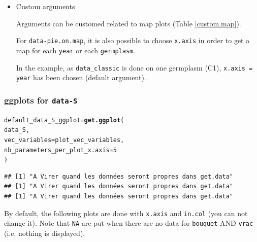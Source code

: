 \documentclass{article}\usepackage[]{graphicx}\usepackage[]{color}
\makeatletter
\newcommand{\hlnum}[1]{\textcolor[rgb]{0.686,0.059,0.569}{#1}}%
\newcommand{\hlstd}[1]{\textcolor[rgb]{0.345,0.345,0.345}{#1}}%
\newcommand{\hlkwb}[1]{\textcolor[rgb]{0.69,0.353,0.396}{#1}}%
\newcommand{\hlkwc}[1]{\textcolor[rgb]{0.333,0.667,0.333}{#1}}%
\newcommand{\hlkwd}[1]{\textcolor[rgb]{0.737,0.353,0.396}{\textbf{#1}}}%
\newenvironment{kframe}{%
 \def\at@end@of@kframe{}%
 \ifinner\ifhmode%
  \def\at@end@of@kframe{\end{minipage}}%
  \begin{minipage}{\columnwidth}%
 \fi\fi%
 \def\FrameCommand##1{\hskip\@totalleftmargin \hskip-\fboxsep
 \colorbox{shadecolor}{##1}\hskip-\fboxsep
     \hskip-\linewidth \hskip-\@totalleftmargin \hskip\columnwidth}%
 \MakeFramed {\advance\hsize-\width
   \@totalleftmargin\z@ \linewidth\hsize
   \@setminipage}}%
 {\par\unskip\endMakeFramed%
 \at@end@of@kframe}
\newenvironment{knitrout}{}{} %
\makeatother
\begin{document}
\begin{itemize}
\begin{itemize}
\item Custom arguments

Arguments can be customed related to map plots (Table \ref{custom.map}).

For \texttt{data-pie.on.map}, it is also possible to choose \texttt{x.axis} in order to get a map for each \texttt{year} or each \texttt{germplasm}.

In the example, as \texttt{data\_classic} is done on one germplasm (C1), \texttt{x.axis = year} has been chosen (default argument).

\end{itemize}

\end{itemize}

\subsubsection{ggplots for \texttt{data-S} }

\begin{knitrout}
\color{fgcolor}\begin{kframe}
\begin{alltt}
\hlstd{default_data_S_ggplot} \hlkwb{=} \hlkwd{get.ggplot}\hlstd{(}
        \hlstd{data_S,}
        \hlkwc{vec_variables} \hlstd{= plot_vec_variables,}
        \hlkwc{nb_parameters_per_plot_x.axis} \hlstd{=} \hlnum{5}
        \hlstd{)}
\end{alltt}


{\ttfamily\noindent\itshape{}}\begin{verbatim}
## [1] "A Virer quand les données seront propres dans get.data"
## [1] "A Virer quand les données seront propres dans get.data"
## [1] "A Virer quand les données seront propres dans get.data"
\end{verbatim}
\end{kframe}
\end{knitrout}

By default, the following plots are done with \texttt{x.axis} and \texttt{in.col} (you can not change it).
Note that \texttt{NA} are put when there are no data for \texttt{bouquet} AND \texttt{vrac} (i.e. nothing is displayed).
\end{document}
